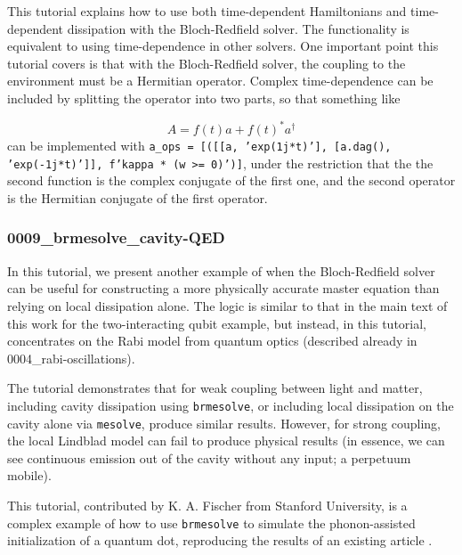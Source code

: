 \documentclass[preprint,3p,sort&compress]{elsarticle}
\def\code#1{\texttt{#1}}
\newcommand{\nocontentsline}[3]{}
\newcommand{\tocless}[2]{\bgroup\let\addcontentsline=\nocontentsline#1{#2}\egroup}
\begin{document}
This tutorial explains how to use both time-dependent Hamiltonians and time-dependent dissipation with the Bloch-Redfield solver.  The functionality is equivalent to using time-dependence in other solvers.  One important point this tutorial covers is that with the Bloch-Redfield solver, the coupling to the environment must be a Hermitian operator.  Complex time-dependence can be included by splitting the operator into two parts, so that something like 

\begin{equation}
A = f(t)a + f(t)^* a^\dagger 
\end{equation}
can be implemented with \code{a\_ops = [([[a, 'exp(1j*t)'], [a.dag(), 'exp(-1j*t)']], f'{kappa} * (w >= 0)')]}, under the restriction that the the second function is the complex conjugate of the first one, and the second operator is the Hermitian conjugate of the first operator.\newline

\tocless\subsubsection{0009\_brmesolve\_cavity-QED}

In this tutorial, we present another example of when the Bloch-Redfield solver can be useful for constructing a more physically accurate master equation than relying on local dissipation alone.  The logic is similar to that in the main text of this work for the two-interacting qubit example, but instead, in this tutorial, concentrates on the Rabi model from quantum optics (described already in 0004\_rabi-oscillations).

The tutorial demonstrates that for weak coupling between light and matter, including cavity dissipation using \code{brmesolve}, or including local dissipation on the cavity alone via \code{mesolve}, produce similar results. However, for strong coupling, the local Lindblad model can fail to produce physical results (in essence, we can see continuous emission out of the cavity without any input;  a perpetuum mobile).\newline



\tocless\subsubsection{0010\_brmesolve\_phonon\_interaction}

This tutorial, contributed by K. A. Fischer from Stanford University,  is a complex example of how to use \code{brmesolve} to simulate the phonon-assisted initialization of a quantum dot, reproducing the results of an existing article \cite{PhysRevB.90.241404}.\newline
\end{document}
